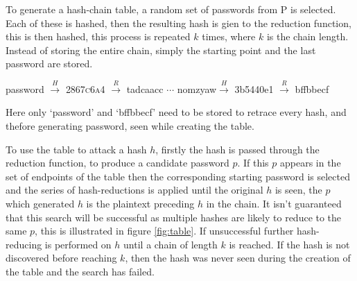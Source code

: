 \documentclass[a4paper,12pt]{article}
\begin{document}
To generate a hash-chain table\cite{Hellman1980}, a random set of passwords from P is selected. Each of these is hashed, then the resulting hash is gien to the reduction function, this is then hashed, this process is repeated $k$ times, where $k$ is the chain length. Instead of storing the entire chain, simply the starting point and the last password are stored. 
\begin{center}
    password $\xrightarrow{H}$ \textsc{2867c6a4} $\xrightarrow{R}$ tadcaacc $\cdots$ nomzyaw$\xrightarrow{H}$ 3b5440e1 $\xrightarrow{R}$ bffbbecf
\end{center}
Here only `password' and `bffbbecf' need to be stored to retrace every hash, and thefore generating password, seen while creating the table.

To use the table to attack a hash $h$, firstly the hash is passed through the reduction function, to produce a candidate password $p$. If this $p$ appears in the set of endpoints of the table then the corresponding starting password is selected and the series of hash-reductions is applied until the original $h$ is seen, the $p$ which generated $h$ is the plaintext preceding $h$ in the chain. 
It isn't guaranteed that this search will be successful as multiple hashes are likely to reduce to the same $p$, this is illustrated in figure \ref{fig:table}. If unsuccessful further hash-reducing is performed on $h$ until a chain of length $k$ is reached. If the hash is not discovered before reaching $k$, then the hash was never seen during the creation of the table and the search has failed.
\end{document}
